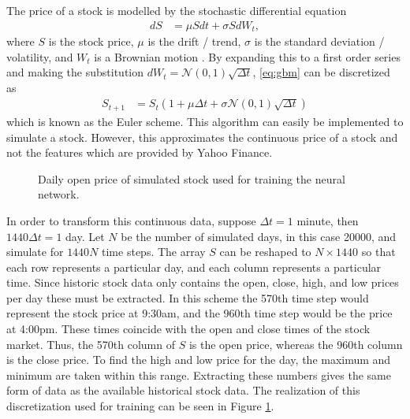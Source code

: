 \documentclass[12pt]{article}
\begin{document}
The price of a stock is modelled by the stochastic differential equation
\begin{align}
dS &= \mu S dt + \sigma S dW_t,
\label{eq:gbm}
\end{align}
where $S$ is the stock price, $\mu$ is the drift / trend, $\sigma$ is the standard deviation / volatility, and $W_t$ is a Brownian motion \cite{dineen, williams}. By expanding this to a first order series and making the substitution $dW_t = \mathcal{N}(0,1) \sqrt{\Delta t}$, \eqref{eq:gbm} can be discretized as
\begin{align*}
S_{t+1} &= S_t \left( 1 + \mu \Delta t + \sigma \mathcal{N}(0,1) \sqrt{\Delta t} \right)
\end{align*}
which is known as the Euler scheme. This algorithm can easily be implemented to simulate a stock. However, this approximates the continuous price of a stock and not the features which are provided by Yahoo Finance. \\

\begin{figure}[htbp]
\centering
{}
\caption{Daily open price of simulated stock used for training the neural network.}
\label{fig:toystock}
\end{figure}

In order to transform this continuous data, suppose $\Delta t = 1$ minute, then $1440 \Delta t = 1$ day. Let $N$ be the number of simulated days, in this case 20000, and simulate for $1440N$ time steps. The array $S$ can be reshaped to $N $ so that each row represents a particular day, and each column represents a particular time. Since historic stock data only contains the open, close, high, and low prices per day these must be extracted. In this scheme the 570th time step would represent the stock price at 9:30am, and the 960th time step would be the price at 4:00pm. These times coincide with the open and close times of the stock market. Thus, the 570th column of $S$ is the open price, whereas the 960th column is the close price. To find the high and low price for the day, the maximum and minimum are taken within this range. Extracting these numbers gives the same form of data as the available historical stock data. The realization of this discretization used for training can be seen in Figure \ref{fig:toystock}.
\end{document}
